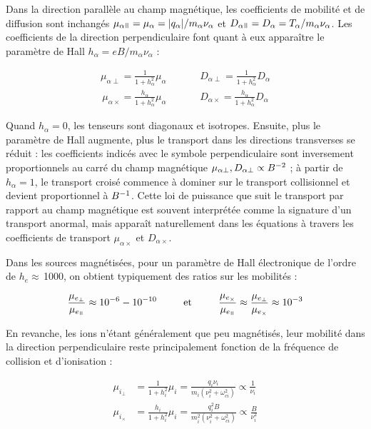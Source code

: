 \begin{refsection}
Dans la direction parallèle au champ magnétique, les coefficients de mobilité et
de diffusion sont inchangés
$\mu_{\alpha\para}=\mu_{\alpha}=|q_\alpha|/m_\alpha\nu_\alpha$ et
$D_{\alpha\para}=D_\alpha=T_\alpha/m_\alpha\nu_\alpha$. Les coefficients de la
direction perpendiculaire font quant à eux apparaître le paramètre de Hall
$h_\alpha=eB/m_\alpha\nu_\alpha$ :

\begin{align}
\mu_{\alpha\perp}=\frac{1}{1+h_\alpha^2}\mu_\alpha\;\;\;\;\;\;\;\;
\;\;\;\;D_{\alpha\perp}=\frac{1}{1+h_\alpha^2}D_\alpha
\end{align}
\begin{align}
\mu_{\alpha\times}=\frac{h_\alpha}{1+h_\alpha^2}\mu_\alpha\;\;\;\;
\;\;\;\;\;\;\;\;D_{\alpha\times}=\frac{h_\alpha}{1+h_\alpha^2}D_\alpha
\end{align}

Quand $h_\alpha=0$, les tenseurs sont diagonaux et isotropes. Ensuite, plus le
paramètre de Hall augmente, plus le transport dans les directions transverses se
réduit :
les coefficients indicés avec le symbole perpendiculaire sont inversement
proportionnels au carré du champ magnétique $\mu_{\alpha\perp},
D_{\alpha\perp}\propto B^{{-2}}$ ; à partir de $h_\alpha=1$, le
transport croisé commence à dominer sur le transport collisionnel et devient proportionnel à
$B^{{-1}}$. Cette loi de puissance que suit le transport par rapport au
champ magnétique est souvent interprétée comme la signature d'un transport
anormal, mais apparaît naturellement dans les équations à travers les
coefficients de transport $\mu_{\alpha\times}$ et $D_{\alpha\times}$.

Dans les sources magnétisées, pour un paramètre de Hall électronique de l'ordre
de $h_e\approx\,$1000, on obtient typiquement des ratios sur les mobilités :

\begin{equation}
\frac{\mu_{e_\perp}}{\mu_{e_\para}}\approx
10^{-6}-10^{-10}\text{~~~~~~~~et~~~~~~~~}\frac{\mu_{e_\times}}{\mu_{e_\para}}\approx
\frac{\mu_{e_\perp}}{\mu_{e_\times}}\approx10^{-3}
\end{equation}

En revanche, les ions n'étant généralement que peu magnétisés, leur mobilité
dans la direction perpendiculaire reste principalement fonction de la fréquence
de collision et d'ionisation  :

\begin{align}
\mu_{i_\perp}&=\frac{1}{1+h_i^2}\mu_i=\frac{q_i\nu_i}{m_i(\nu_i^2+\omega_{ci}^2)}\propto\frac{1}{\nu_i}\\
\mu_{i_\times}&=\frac{h_i}{1+h_i^2}\mu_i=\frac{q_i^2B}{m_i^2(\nu_i^2+\omega_{ci}^2)}\propto\frac{B}{\nu_i^2}
\end{align}


\end{refsection}
